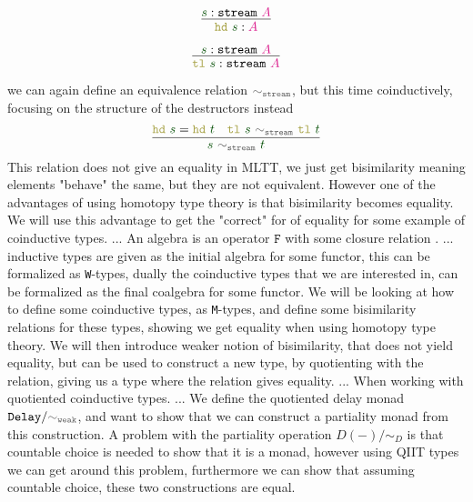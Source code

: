 \documentclass[twoside,11pt,openright]{report}
\theoremstyle{plain} %
\theoremstyle{definition}
\theoremstyle{remark}
\newcommand*{\term}[1]{\textcolor{green!30!black}{#1}} %
\newcommand*{\type}[1]{\textcolor{magenta!90!black}{#1}}
\newcommand*{\relation}[1]{\textcolor{gray!75!black}{\ensuremath{\mathtt{#1}}}}
\newcommand*{\destructor}[1]{\textcolor{yellow!60!black}{\ensuremath{\mathtt{#1}}}}
\newcommand*{\typeformer}[1]{\ensuremath{\mathtt{#1}}}
\newcommand*{\functor}[1]{\ensuremath{\mathbf{\mathtt{#1}}}}
\begin{document}
\begin{center}
  \strut
  \hfill
  \begin{minipage}{0.225\linewidth}
    \begin{equation}
      \vcenter{\infer{\destructor{hd}~\term{s} : \type{A}}{\term{s} : \typeformer{stream}~\type{A}}}
    \end{equation}
  \end{minipage}
  \hfill
  \begin{minipage}{0.25\linewidth}
    \begin{equation}
      \vcenter{\infer{\destructor{tl}~\term{s}: \typeformer{stream}~\type{A}}{\term{s} : \typeformer{stream}~\type{A}}}
    \end{equation}
  \end{minipage}
  \hfill
  \strut
\end{center}
we can again define an equivalence relation \(\relation{\sim_{stream}}\), but this time coinductively, focusing on the structure of the destructors instead
\begin{equation}
  \vcenter{\infer{\term{s}~\relation{\sim_{stream}}~\term{t}}{\destructor{hd}~\term{s} = \destructor{hd}~\term{t} & \destructor{tl}~\term{s}~\relation{\sim_{stream}}~\destructor{tl}~\term{t}}}
\end{equation}
This relation does not give an equality in MLTT, we just get bisimilarity meaning elements "behave" the same, but they are not equivalent. However one of the advantages of using homotopy type theory is that bisimilarity becomes equality. We will use this advantage to get the "correct" for of equality for some example of coinductive types. ... An algebra is an operator \(\functor{F}\) with some closure relation . ... inductive types are given as the initial algebra for some functor, this can be formalized as \texttt{W}-types, dually the coinductive types that we are interested in, can be formalized as the final coalgebra  for some functor. We will be looking at how to define some coinductive types, as \texttt{M}-types, and define some bisimilarity relations for these types, showing we get equality when using homotopy type theory. We will then introduce weaker notion of bisimilarity, that does not yield equality, but can be used to construct a new type, by quotienting with the relation, giving us a type where the relation gives equality. ... When working with quotiented coinductive types.  ... We define the quotiented delay monad \(\typeformer{Delay}/\relation{\sim_{weak}}\), and want to show that we can construct a partiality monad from this construction. A problem with the partiality operation \(D(-)/{\sim}_D\) is that countable choice is needed to show that it is a monad, however using QIIT types we can get around this problem, furthermore we can show that assuming countable choice, these two constructions are equal.
\end{document}
